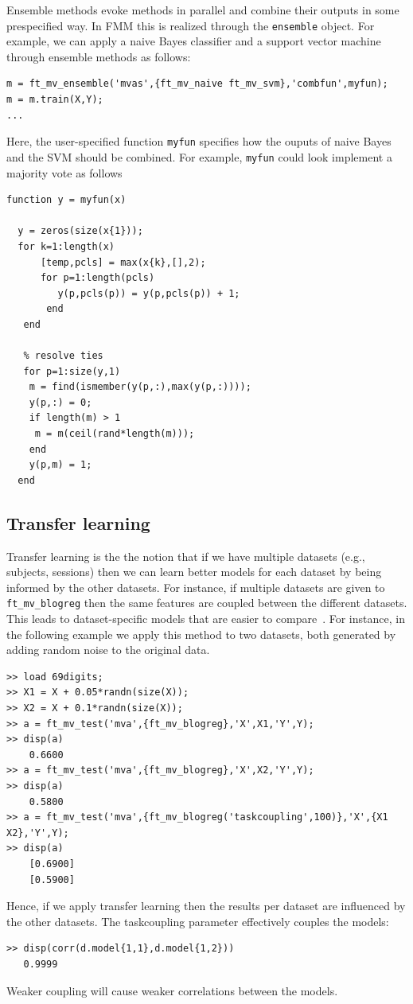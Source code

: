 \documentclass{article}
\renewcommand{\t}[1]{{\tt #1}}
\begin{document}
Ensemble methods evoke methods in parallel and combine their outputs in some prespecified way. In FMM this is realized through the \t{ensemble} object. For example, we can apply a naive Bayes classifier and a support vector machine through ensemble methods as follows:
\begin{verbatim}
m = ft_mv_ensemble('mvas',{ft_mv_naive ft_mv_svm},'combfun',myfun);
m = m.train(X,Y);
...
\end{verbatim}
Here, the user-specified function \t{myfun} specifies how the ouputs of naive Bayes and the SVM should be combined. For example, \t{myfun} could look implement a majority vote as follows
\begin{verbatim}
function y = myfun(x)

  y = zeros(size(x{1}));
  for k=1:length(x)
      [temp,pcls] = max(x{k},[],2);
      for p=1:length(pcls)
         y(p,pcls(p)) = y(p,pcls(p)) + 1;
       end
   end
            
   % resolve ties
   for p=1:size(y,1)
    m = find(ismember(y(p,:),max(y(p,:))));
    y(p,:) = 0;
    if length(m) > 1
     m = m(ceil(rand*length(m)));
    end
    y(p,m) = 1;
  end
\end{verbatim}


\subsection{Transfer learning}

Transfer learning is the the notion that if we have multiple datasets (e.g., subjects, sessions) then we can learn better models for each dataset by being informed by the other datasets. For instance, if multiple datasets are given to \t{ft\_mv\_blogreg} then the same features are coupled between the different datasets. This leads to dataset-specific models that are easier to compare~\cite{gerven2010b}. For instance, in the following example we apply this method to two datasets, both generated by adding random noise to the original data.
\begin{verbatim}
>> load 69digits;
>> X1 = X + 0.05*randn(size(X));
>> X2 = X + 0.1*randn(size(X));
>> a = ft_mv_test('mva',{ft_mv_blogreg},'X',X1,'Y',Y);
>> disp(a)
    0.6600
>> a = ft_mv_test('mva',{ft_mv_blogreg},'X',X2,'Y',Y);
>> disp(a)
    0.5800
>> a = ft_mv_test('mva',{ft_mv_blogreg('taskcoupling',100)},'X',{X1 X2},'Y',Y);
>> disp(a)
    [0.6900]
    [0.5900]
\end{verbatim}
Hence, if we apply transfer learning then the results per dataset are influenced by the other datasets. The taskcoupling parameter effectively couples the models:
\begin{verbatim}
>> disp(corr(d.model{1,1},d.model{1,2}))
   0.9999
\end{verbatim}
Weaker coupling will cause weaker correlations between the models.
\end{document}
